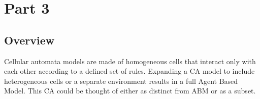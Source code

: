 \documentclass[11pt]{article} %
\begin{document}









\section{Part 3}

\subsection{Overview}

Cellular automata models are made of homogeneous cells that interact only with each other according to a defined set of rules. Expanding a CA model to include heterogeneous cells or a separate environment results in a full Agent Based Model. This CA could be thought of either as distinct from ABM or as a subset. 
 
\end{document}
